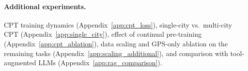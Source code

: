 \documentclass{article}
\begin{document}
\begin{table}[t]
\centering
\caption{GPS-only ablation on our domain-specific models for \textbf{Optimal Route Generation} with 10,000 test samples across four cities. Only raw GPS coordinates are provided as input.}
\label{tab:gps_ours}
\small
\setlength{\tabcolsep}{3pt}
\renewcommand{\arraystretch}{1.05}
\end{table}
\endgroup

\paragraph{Additional experiments.} CPT training dynamics (Appendix~\ref{app:cpt_loss}), single-city vs.\ multi-city CPT (Appendix~\ref{app:single_city}), effect of continual pre-training (Appendix~\ref{app:cpt_ablation}), data scaling and GPS-only ablation on the remaining tasks (Appendix~\ref{app:scaling_additional}), and comparison with tool-augmented LLMs (Appendix~\ref{app:rag_comparison}).
\end{document}
